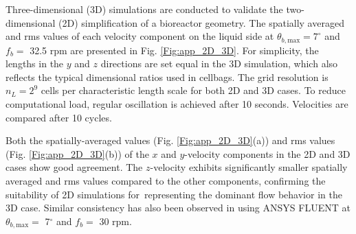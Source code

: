 \documentclass[final,3p,times,twocolumn,authoryear]{elsarticle}
\theoremstyle{definition}
\begin{document}
Three-dimensional (3D) simulations are conducted to validate the two-dimensional (2D) simplification of a bioreactor geometry. The spatially averaged and rms values of each velocity component on the liquid side at $\theta_{b,\textrm{max}}= 7^{\circ}$ and $f_b=$ 32.5 rpm are presented in Fig. \ref{Fig:app_2D_3D}. For simplicity, the lengths in the $y$ and $z$ directions are set equal in the 3D simulation, which also reflects the typical dimensional ratios used in cellbags. The grid resolution is $n_L=2^9$ cells per characteristic length scale for both 2D and 3D cases. To reduce computational load, regular oscillation is achieved after 10 seconds. Velocities are compared after 10 cycles. 

Both the spatially-averaged values (Fig. \ref{Fig:app_2D_3D}(a)) and rms values (Fig. \ref{Fig:app_2D_3D}(b)) of the $x$ and $y$-velocity components in the 2D and 3D cases show good agreement. The $z$-velocity exhibits significantly smaller spatially averaged and rms values compared to the other components, confirming the suitability of 2D simulations for representing the dominant flow behavior in the 3D case. Similar consistency has also been observed in \citet{Zhan2019} using ANSYS FLUENT at $\theta_{b,\textrm{max}}=$ 7$^\circ$ and $f_b=$ 30 rpm. 

 


\end{document}
